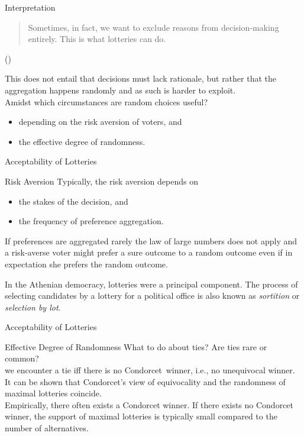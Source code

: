\documentclass{beamer}
\theoremstyle{definition}
\def\g#1{{\usebeamercolor[fg]{block title example}{#1}}}
\begin{document}
\begin{frame}{Interpretation}
\blockquote{Sometimes, in fact, we want to exclude reasons from decision‐making entirely. This is what lotteries can do.}\par(\cite{Stone2011})\pause\vspace{10pt}

This does not entail that decisions must lack rationale, but rather that the aggregation happens randomly and as such is harder to exploit.\pause \\[20pt]

Amidst which circumstances are random choices useful?\pause
\begin{itemize}
    \item depending on the risk aversion of voters, and
    \item the effective degree of randomness.
\end{itemize}
\end{frame}

\begin{frame}{Acceptability of Lotteries}
\begin{block}{Risk Aversion}
Typically, the risk aversion depends on
\begin{itemize}
    \item the stakes of the decision\pause, and
    \item the frequency of preference aggregation.
\end{itemize}\pause

If preferences are aggregated rarely the law of large numbers does not apply and a risk-averse voter might prefer a sure outcome to a random outcome even if in expectation she prefers the random outcome.
\end{block}\pause\vspace{10pt}

In the Athenian democracy, lotteries were a principal component. The process of selecting candidates by a lottery for a political office is also known as \emph{sortition} or \emph{selection by lot}.
\end{frame}

\begin{frame}{Acceptability of Lotteries}
\begin{block}{Effective Degree of Randomness}
What to do about ties? Are ties rare or common?\pause \\[15pt]

\g{Condorcet view:} we encounter a tie iff there is no Condorcet~winner, i.e., no unequivocal winner.\pause \\[5pt]
It can be shown that Condorcet's view of equivocality and the randomness of maximal lotteries coincide.\pause \\[15pt]

Empirically, there often exists a Condorcet winner. If there exists no Condorcet winner, the support of maximal lotteries is typically small compared to the number of alternatives.
\end{block}
\end{frame}
\end{document}
